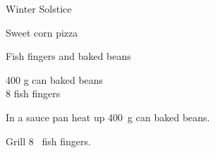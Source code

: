 \begin{menu}{Winter Solstice}
\begin{recipe}{2}{Sweet corn pizza}
\begin{instructions}
    \end{instructions}
    \end{recipe}%
  
    \begin{recipe}{1}{Fish fingers and baked beans}%
    
		\begin{ingredients}
		400 g can baked beans  \\
	8  fish fingers  \\
	
		\end{ingredients}
	
    \begin{instructions}
    \item 
        In a sauce pan heat up
        400~g  can baked beans.
      \item 
        Grill
        8~  fish fingers.
      
    \end{instructions}
    \end{recipe}%
  
    \clearpage
    \end{menu}
	
